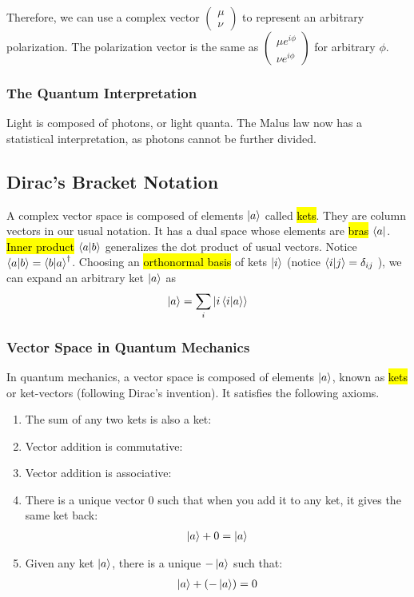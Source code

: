 Therefore, we can use a complex vector $\begin{pmatrix}
    \mu \\ \nu
\end{pmatrix}$ to represent an arbitrary polarization. The polarization vector is the same as $\begin{pmatrix}
    \mu e^{i\phi}\\ \nu e^{i\phi}
\end{pmatrix}$ for arbitrary $\phi$.

\subsubsection{The Quantum Interpretation}
Light is composed of photons, or light quanta. The Malus law now has a statistical interpretation, as photons cannot be further divided.

\subsection{Dirac’s Bracket Notation}
A complex vector space is composed of elements $\ket{a}$ called \hl{kets}. They are column vectors in our usual notation. It has a dual space whose elements are \hl{bras} $\bra{a}$. \hl{Inner product} $\braket{a|b}$ generalizes the dot product of usual vectors. Notice $\braket{a|b}=\braket{b|a}^{\dagger}$. Choosing an \hl{orthonormal basis} of kets $\ket{i}$ (notice $\braket{i|j}=\delta_{ij}$ ), we can expand an arbitrary ket $\ket{a}$ as
\begin{align*}
    \ket{a}=\sum_i\ket{i \braket{i|a}}
\end{align*}

\subsubsection{Vector Space in Quantum Mechanics}

In quantum mechanics, a vector space is composed of elements $\ket{a}$, known as \hl{kets} or ket-vectors (following Dirac’s invention). It satisfies the following axioms.
\begin{enumerate}
    \item The sum of any two kets is also a ket:
    \item Vector addition is commutative:
    \item Vector addition is associative:
    \item There is a unique vector 0 such that when you add it to any ket, it gives the same ket back:
    \begin{align*}
        \ket{a}+0=\ket{a}
    \end{align*}
    \item Given any ket $\ket{a}$, there is a unique $-\ket{a}$ such that: 
    \begin{align*}
        \ket{a}+(-\ket{a})=0
    \end{align*}
\end{enumerate}

